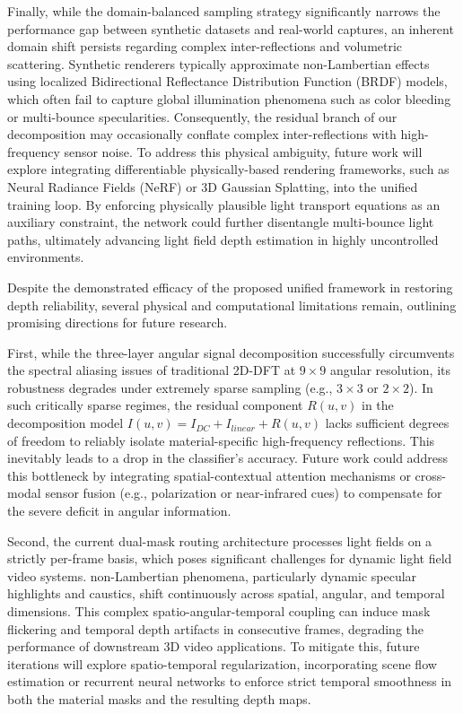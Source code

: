 Finally, while the domain-balanced sampling strategy significantly narrows the performance gap between synthetic datasets and real-world captures, an inherent domain shift persists regarding complex inter-reflections and volumetric scattering. Synthetic renderers typically approximate non-Lambertian effects using localized Bidirectional Reflectance Distribution Function (BRDF) models, which often fail to capture global illumination phenomena such as color bleeding or multi-bounce specularities. Consequently, the residual branch of our decomposition may occasionally conflate complex inter-reflections with high-frequency sensor noise. To address this physical ambiguity, future work will explore integrating differentiable physically-based rendering frameworks, such as Neural Radiance Fields (NeRF) or 3D Gaussian Splatting, into the unified training loop. By enforcing physically plausible light transport equations as an auxiliary constraint, the network could further disentangle multi-bounce light paths, ultimately advancing light field depth estimation in highly uncontrolled environments.

Despite the demonstrated efficacy of the proposed unified framework in restoring depth reliability, several physical and computational limitations remain, outlining promising directions for future research.

First, while the three-layer angular signal decomposition successfully circumvents the spectral aliasing issues of traditional 2D-DFT at $9 \times 9$ angular resolution, its robustness degrades under extremely sparse sampling (e.g., $3 \times 3$ or $2 \times 2$). In such critically sparse regimes, the residual component $R(u,v)$ in the decomposition model $I(u,v) = I_{DC} + I_{linear} + R(u,v)$ lacks sufficient degrees of freedom to reliably isolate material-specific high-frequency reflections. This inevitably leads to a drop in the classifier's accuracy. Future work could address this bottleneck by integrating spatial-contextual attention mechanisms or cross-modal sensor fusion (e.g., polarization or near-infrared cues) to compensate for the severe deficit in angular information.

Second, the current dual-mask routing architecture processes light fields on a strictly per-frame basis, which poses significant challenges for dynamic light field video systems. non-Lambertian phenomena, particularly dynamic specular highlights and caustics, shift continuously across spatial, angular, and temporal dimensions. This complex spatio-angular-temporal coupling can induce mask flickering and temporal depth artifacts in consecutive frames, degrading the performance of downstream 3D video applications. To mitigate this, future iterations will explore spatio-temporal regularization, incorporating scene flow estimation or recurrent neural networks to enforce strict temporal smoothness in both the material masks and the resulting depth maps.

